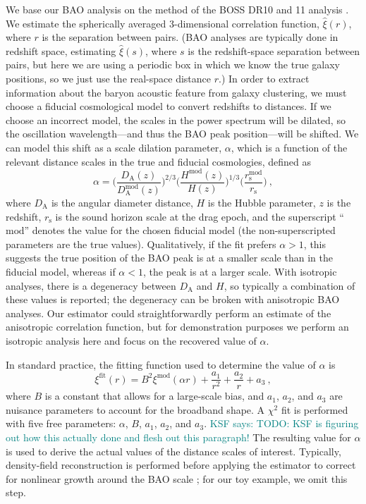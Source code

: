 \documentclass[modern]{aastex62}
\newcommand{\KSF}[1]{\textcolor{teal}{KSF says: #1}}
\begin{document}
We base our BAO analysis on the method of the BOSS DR10 and 11 analysis \citep{Anderson2014}.
We estimate the spherically averaged 3-dimensional correlation function, $\hat{\xi}(r)$, where $r$ is the separation between pairs.
(BAO analyses are typically done in redshift space, estimating $\hat{\xi}(s)$, where $s$ is the redshift-space separation between pairs, but here we are using a periodic box in which we know the true galaxy positions, so we just use the real-space distance $r$.)
In order to extract information about the baryon acoustic feature from galaxy clustering, we must choose a fiducial cosmological model to convert redshifts to distances.
If we choose an incorrect model, the scales in the power spectrum will be dilated, so the oscillation wavelength---and thus the BAO peak position---will be shifted.
We can model this shift as a scale dilation parameter, $\alpha$, which is a function of the relevant distance scales in the true and fiducial cosmologies, defined as
\begin{equation} \label{eq:alpha}
\alpha = \Bigg( \frac{D_\mathrm{A}(z)}{D_\mathrm{A}^{\text{mod}}(z)} \Bigg)^{2/3} \Bigg( \frac{H^{\text{mod}}(z)}{H(z)} \Bigg)^{1/3} \Bigg( \frac{r_\mathrm{s}^{\text{mod}}}{r_\mathrm{s}} \Bigg) ~,
\end{equation}
where $D_\mathrm{A}$ is the angular diameter distance, $H$ is the Hubble parameter, $z$ is the redshift, $r_\mathrm{s}$ is the sound horizon scale at the drag epoch, and the superscript ``$\text{mod}$'' denotes the value for the chosen fiducial model (the non-superscripted parameters are the true values).
Qualitatively, if the fit prefers $\alpha>1$, this suggests the true position of the BAO peak is at a smaller scale than in the fiducial model, whereas if $\alpha<1$, the peak is at a larger scale.
With isotropic analyses, there is a degeneracy between $D_\mathrm{A}$ and $H$, so typically a combination of these values is reported; the degeneracy can be broken with anisotropic BAO analyses.
Our estimator could straightforwardly perform an estimate of the anisotropic correlation function, but for demonstration purposes we perform an isotropic analysis here and focus on the recovered value of $\alpha$.

In standard practice, the fitting function used to determine the value of $\alpha$ is 
\begin{equation}
\xi^{\mathrm{fit}}(r) = B^2 \xi^{\mathrm{mod}}(\alpha r) + \frac{a_1}{r^2} + \frac{a_2}{r} + a_3 ~,
\end{equation}
where $B$ is a constant that allows for a large-scale bias, and $a_1$, $a_2$, and $a_3$ are nuisance parameters to account for the broadband shape.
A $\chi^2$ fit is performed with five free parameters: $\alpha$, $B$, $a_1$, $a_2$, and $a_3$. 
\KSF{TODO: KSF is figuring out how this actually done and flesh out this paragraph!}
The resulting value for $\alpha$ is used to derive the actual values of the distance scales of interest.
Typically, density-field reconstruction is performed before applying the estimator to correct for nonlinear growth around the BAO scale \citep{Eisenstein2007}; for our toy example, we omit this step.
\end{document}
